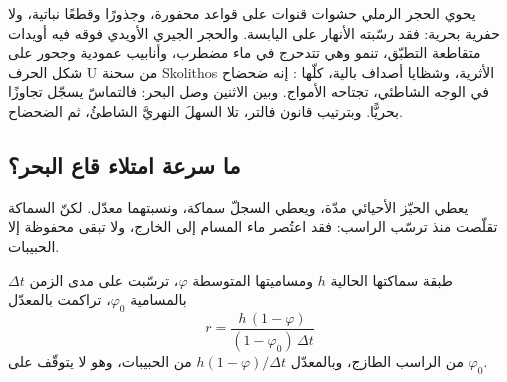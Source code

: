 \begin{omfigure}
\par{}
\end{omfigure}

\begin{example}\label{ex:b2:palaeoenvironments:base}
يحوي الحجر الرملي حشوات قنوات على قواعد محفورة، وجذورًا وقطعًا نباتية، ولا حفرية
بحرية: فقد رسّبته الأنهار على اليابسة. والحجر الجيري الأويدي فوقه فيه أويدات متقاطعة التطبّق،
تنمو وهي تتدحرج في ماء مضطرب، وأنابيب عمودية وجحور على شكل الحرف U من سحنة Skolithos
الأثرية، وشظايا أصداف بالية، كلّها : إنه ضحضاح في الوجه الشاطئي،
تجتاحه الأمواج. وبين الاثنين وصل البحر: فالتماسّ يسجّل تجاوزًا بحريًّا.
وبترتيب قانون فالتر، تلا السهلَ النهريَّ الشاطئُ، ثم الضحضاح.
\end{example}

\subsection*{ما سرعة امتلاء قاع البحر؟}

يعطي الحيّز الأحيائي مدّة، ويعطي السجلّ سماكة، ونسبتهما معدّل. لكنّ
السماكة تقلّصت منذ ترسّب الراسب: فقد اعتُصر ماء المسام
إلى الخارج، ولا تبقى محفوظة إلا الحبيبات.

\begin{proposition}\label{prop:b2:palaeoenvironments:rate}
طبقة سماكتها الحالية $h$ ومساميتها المتوسطة $\varphi$، ترسّبت على مدى الزمن $\Delta t$
بالمسامية $\varphi_0$، تراكمت بالمعدّل
\[
  r = \frac{h\,(1 - \varphi)}{(1 - \varphi_0)\,\Delta t}
\]
من الراسب الطازج، وبالمعدّل $h(1-\varphi)/\Delta t$ من الحبيبات، وهو لا يتوقّف على
$\varphi_0$.
\end{proposition}

